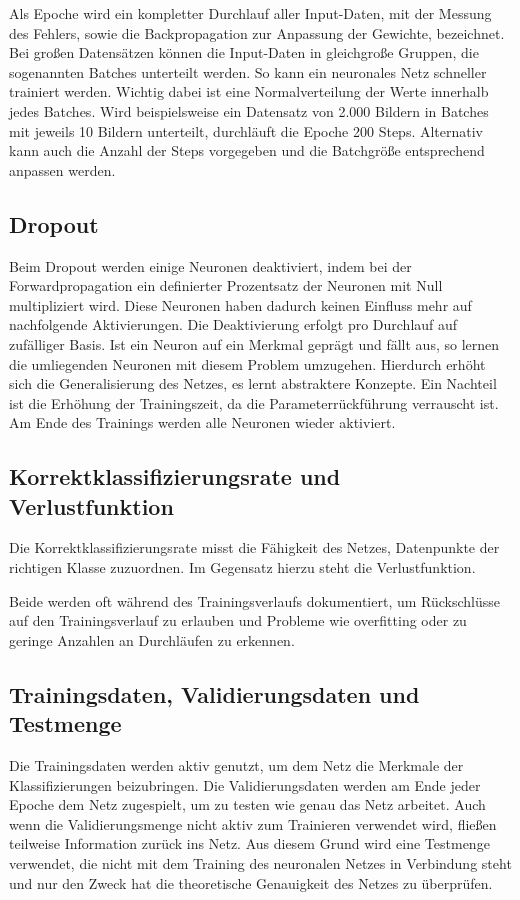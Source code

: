 Als Epoche wird ein kompletter Durchlauf aller Input-Daten, mit der Messung des Fehlers, 
sowie die Backpropagation zur Anpassung der Gewichte, bezeichnet. Bei großen Datensätzen 
können die Input-Daten in gleichgroße Gruppen, die sogenannten Batches unterteilt werden. 
So kann ein neuronales Netz schneller trainiert werden. Wichtig dabei ist eine Normalverteilung 
der Werte innerhalb jedes Batches. Wird beispielsweise ein Datensatz von 2.000 Bildern in 
Batches mit jeweils 10 Bildern unterteilt, durchläuft die Epoche 200 Steps. Alternativ kann 
auch die Anzahl der Steps vorgegeben und die Batchgröße entsprechend anpassen werden.\cite{Becker:2018b}

\subsection{Dropout}

Beim Dropout werden einige Neuronen deaktiviert, indem bei der Forwardpropagation ein
definierter Prozentsatz der Neuronen mit Null multipliziert wird. Diese Neuronen haben
dadurch keinen Einfluss mehr auf nachfolgende Aktivierungen. Die Deaktivierung erfolgt
pro Durchlauf auf zufälliger Basis. Ist ein Neuron auf ein Merkmal geprägt und fällt aus,
so lernen die umliegenden Neuronen mit diesem Problem umzugehen. Hierdurch erhöht
sich die Generalisierung des Netzes, es lernt abstraktere Konzepte. Ein Nachteil ist die
Erhöhung der Trainingszeit, da die Parameterrückführung verrauscht ist. Am Ende des
Trainings werden alle Neuronen wieder aktiviert. \cite{Becker:2018b}

\subsection{Korrektklassifizierungsrate und Verlustfunktion}

Die Korrektklassifizierungsrate misst die Fähigkeit des Netzes, Datenpunkte der richtigen
Klasse zuzuordnen. Im Gegensatz hierzu steht die Verlustfunktion. \cite{Chollet:2018}

Beide werden oft während des Trainingsverlaufs dokumentiert, um Rückschlüsse
auf den Trainingsverlauf zu erlauben und Probleme wie overfitting oder zu geringe Anzahlen an Durchläufen
zu erkennen.

\subsection{Trainingsdaten, Validierungsdaten und Testmenge}
	Die Trainingsdaten werden aktiv genutzt, um dem Netz die Merkmale der Klassifizierungen beizubringen. 
	Die Validierungsdaten werden am Ende jeder Epoche dem Netz
	zugespielt, um zu testen wie genau das Netz arbeitet. Auch wenn die Validierungsmenge
	nicht aktiv zum Trainieren verwendet wird, fließen teilweise Information zurück ins Netz.
	Aus diesem Grund wird eine Testmenge verwendet, die nicht mit dem Training des neuronalen Netzes in 
	Verbindung steht und nur den Zweck hat die theoretische Genauigkeit
	des Netzes zu überprüfen. \cite{Becker:2018}

